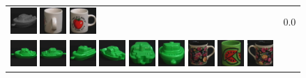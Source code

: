 \begin{figure}[tbp]
\begin{center}
\begin{tabular}{m{11cm} | m{3cm} |}
\includegraphics[width=1cm]{coil/beeld-29.eps}
\includegraphics[width=1cm]{coil/beeld-41.eps}
\includegraphics[width=1cm]{coil/beeld-36.eps}
& {\scriptsize 0.0}
\\
\includegraphics[width=1cm]{coil/beeld-54.eps}
\includegraphics[width=1cm]{coil/beeld-55.eps}
\includegraphics[width=1cm]{coil/beeld-57.eps}
\includegraphics[width=1cm]{coil/beeld-58.eps}
\includegraphics[width=1cm]{coil/beeld-59.eps}
\includegraphics[width=1cm]{coil/beeld-56.eps}
\includegraphics[width=1cm]{coil/beeld-60.eps}
\includegraphics[width=1cm]{coil/beeld-32.eps}
\includegraphics[width=1cm]{coil/beeld-61.eps}

\end{tabular}
\end{center}
\end{figure}
